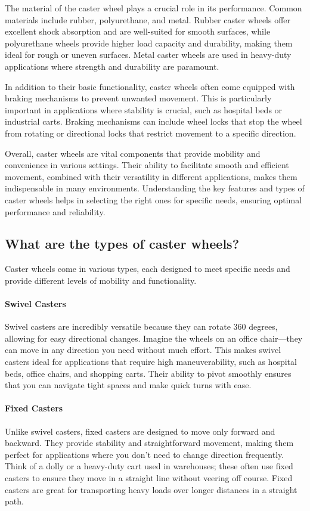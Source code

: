 \documentclass[../../main]{subfiles}
\begin{document}
The material of the caster wheel plays a crucial role in its performance. Common materials include rubber, polyurethane, and metal. Rubber caster wheels offer excellent shock absorption and are well-suited for smooth surfaces, while polyurethane wheels provide higher load capacity and durability, making them ideal for rough or uneven surfaces. Metal caster wheels are used in heavy-duty applications where strength and durability are paramount.

In addition to their basic functionality, caster wheels often come equipped with braking mechanisms to prevent unwanted movement. This is particularly important in applications where stability is crucial, such as hospital beds or industrial carts. Braking mechanisms can include wheel locks that stop the wheel from rotating or directional locks that restrict movement to a specific direction.

Overall, caster wheels are vital components that provide mobility and convenience in various settings. Their ability to facilitate smooth and efficient movement, combined with their versatility in different applications, makes them indispensable in many environments. Understanding the key features and types of caster wheels helps in selecting the right ones for specific needs, ensuring optimal performance and reliability.

\subsection{What are the types of caster wheels?}
Caster wheels come in various types, each designed to meet specific needs and provide different levels of mobility and functionality.
\paragraph{Swivel Casters} 
Swivel casters are incredibly versatile because they can rotate 360 degrees, allowing for easy directional changes. Imagine the wheels on an office chair—they can move in any direction you need without much effort. This makes swivel casters ideal for applications that require high maneuverability, such as hospital beds, office chairs, and shopping carts. Their ability to pivot smoothly ensures that you can navigate tight spaces and make quick turns with ease.

\paragraph{Fixed Casters}
Unlike swivel casters, fixed casters are designed to move only forward and backward. They provide stability and straightforward movement, making them perfect for applications where you don't need to change direction frequently. Think of a dolly or a heavy-duty cart used in warehouses; these often use fixed casters to ensure they move in a straight line without veering off course. Fixed casters are great for transporting heavy loads over longer distances in a straight path.
\end{document}
